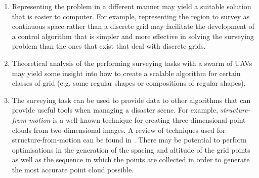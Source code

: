 \begin{enumerate}
    \item Representing the problem in a different manner may yield a suitable solution that is easier to computer. For example, representing the region to survey as continuous space rather than a discrete grid may facilitate the development of a control algorithm that is simpler and more effective in solving the surveying problem than the ones that exist that deal with discrete grids.
    \item Theoretical analysis of the performing surveying tasks with a swarm of UAVs may yield some insight into how to create a scalable algorithm for certain classes of grid (e.g. some regular shapes or compositions of regular shapes).
    \item The surveying task can be used to provide data to other algorithms that can provide useful tools when managing a disaster scene. For example, \textit{structure-from-motion} is a well-known technique for creating three-dimensional point clouds from two-dimensional images. A review of techniques used for structure-from-motion can be found in \cite{Bianco2018EvaluatingPipelines}. There may be potential to perform optimisations in the generation of the spacing and altitude of the grid points as well as the sequence in which the points are collected in order to generate the most accurate point cloud possible.
    

\end{enumerate}
